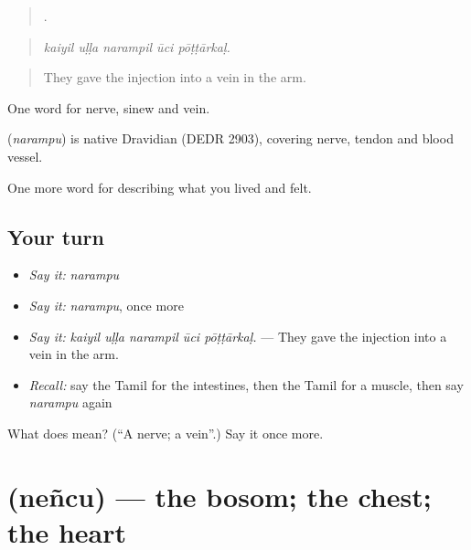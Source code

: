 \begin{quote}
    .
\end{quote}

\begin{quote}
\emph{kaiyil uḷḷa narampil ūci pōṭṭārkaḷ.}
\end{quote}

\begin{quote}
They gave the injection into a vein in the arm.
\end{quote}

One word for nerve, sinew and vein.

\begin{cousinweb}
\textbf{} (\emph{narampu}) is native Dravidian (DEDR 2903), covering nerve, tendon and blood vessel.
\end{cousinweb}

\begin{grammarlens}[title={What you've built}]
One more word for describing what you lived and felt.
\end{grammarlens}

\subsection*{Your turn}
\begin{itemize}
\raggedright
  \item \emph{Say it:} \emph{narampu}
  \item \emph{Say it:} \emph{narampu}, once more
  \item \emph{Say it:} \emph{kaiyil uḷḷa narampil ūci pōṭṭārkaḷ.} — They gave the injection into a vein in the arm.
  \item \emph{Recall:} say the Tamil for the intestines, then the Tamil for a muscle, then say \emph{narampu} again
\end{itemize}

\begin{tcolorbox}[breakable,colback=teal!4,colframe=teal!35!black,title={Before you move on}]
What does  mean? (\textquotedblleft{}A nerve; a vein\textquotedblright{}.) Say it once more.
\end{tcolorbox}
\section[\texorpdfstring{\ta{நெஞ்சு} (neñcu)}{நெஞ்சு (neñcu)}]{ (neñcu) — the bosom; the chest; the heart}

